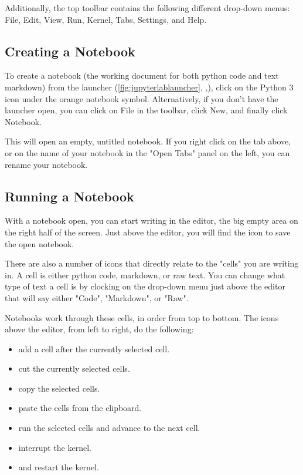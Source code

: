 \documentclass[pdftex,12pt]{artikel3}
\newcommand{\tabfigref}[1]{\autoref{#1}, \nameref{#1},}
\begin{document}
Additionally, the top toolbar contains the following different drop-down menus: File, Edit, View, Run, Kernel, Tabs, Settings, and Help.

\subsection{Creating a Notebook}

To create a notebook (the working document for both python code and text markdown) from the launcher (\tabfigref{fig:jupyterlablauncher}), click on the Python 3 icon under the orange notebook symbol. Alternatively, if you don't have the launcher open, you can click on File in the toolbar, click New, and finally click Notebook.

This will open an empty, untitled notebook. If you right click on the tab above, or on the name of your notebook in the "Open Tabs" panel on the left, you can rename your notebook.

\subsection{Running a Notebook}

With a notebook open, you can start writing in the editor, the big empty area on the right half of the screen. Just above the editor, you will find the icon to save the open notebook.

There are also a number of icons that directly relate to the "cells" you are writing in. A cell is either python code, markdown, or raw text. You can change what type of text a cell is by clocking on the drop-down menu just above the editor that will say either "Code", "Markdown", or "Raw".

Notebooks work through these cells, in order from top to bottom. The icons above the editor, from left to right, do the following: 

\begin{itemize}
    \item add a cell after the currently selected cell.
    \item cut the currently selected cells.
    \item copy the selected cells.
    \item paste the cells from the clipboard.
    \item run the selected cells and advance to the next cell.
    \item interrupt the kernel.
    \item and restart the kernel.
\end{itemize}
\end{document}
